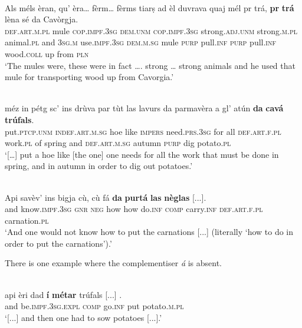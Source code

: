 \ea
\label{ex:purp:inf:3}
\\
\gll Als méls èran, qu’ èra… fèrm… fèrms tiarṣ ad èl duvrava quaj mél pr trá, \textbf{pr} \textbf{trá} lèna sé da Cavòrgja.   \\
\textsc{def.art.m.pl} mule \textsc{cop.impf.3sg} \textsc{dem.unm} \textsc{cop.impf.3sg} strong.\textsc{adj.unm} strong.\textsc{m.pl} animal.\textsc{pl} and \textsc{3sg.m} use.\textsc{impf.3sg} \textsc{dem.m.sg} mule \textsc{purp} pull.\textsc{inf} \textsc{purp} pull.\textsc{inf} wood.\textsc{coll} up from \textsc{pln}  \\
\glt `The mules were, these were in fact …. strong … strong animals and he used that mule for transporting wood up from Cavorgia.'
\z

\ea
\label{ex:purp:inf:4}
 {\citealt[143]{Büchli1966}}\\
\gll  [...] méz in pétg sc’ ins drùva par tùt las lavurs da parmavèra a gl’ atún \textbf{da} \textbf{cavá} \textbf{trúfals}.\\
{} put.\textsc{ptcp.unm} \textsc{indef.art.m.sg} hoe like \textsc{impers} need.\textsc{prs.3sg} for all \textsc{def.art.f.pl} work.\textsc{pl} of spring and \textsc{def.art.m.sg} autumn \textsc{purp} dig potato.\textsc{pl}\\
\glt `[…] put a hoe like [the one] one needs for all the work that must be done in spring, and in autumn in order to dig out potatoes.'
\z

\ea
\label{ex:purp:inf:5}
\\
\gll    Api savèv’ ins bigja cù, cù fá \textbf{da} \textbf{purtá} \textbf{las} \textbf{nèglas} [...].\\
and know.\textsc{impf.3sg} \textsc{gnr} \textsc{neg} how how do.\textsc{inf} \textsc{comp} carry.\textsc{inf} \textsc{def.art.f.pl} carnation.\textsc{pl} \\
\glt `And one would not know how to put the carnations [...] (literally `how to do in order to put the carnations').'
\z

There is one example where the complementiser \textit{á} is absent.

\ea
\label{ex:purp:inf:6}
\\
	\gll [...] api èri dad \textbf{í} \longrule {} \textbf{métar} trúfals [...] .\\
{} and be.\textsc{impf.3sg.expl} \textsc{comp} go.\textsc{inf} {}  put potato.\textsc{m.pl}\\
\glt `[...] and then one had to sow potatoes [...].'
\z

